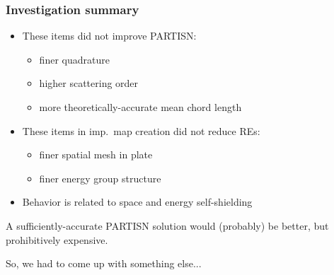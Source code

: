 \documentclass[xcolor=x11names,compress, handout]{beamer}
\renewcommand{\(}{\begin{columns}}
\renewcommand{\)}{\end{columns}}
\newcommand{\<}[1]{\begin{column}{#1}}
\renewcommand{\>}{\end{column}}
\begin{document}
\begin{frame}[fragile]
  \frametitle{Investigation summary}
  
	\begin{itemize}
	\item These items did not improve PARTISN:
	 \begin{itemize}
	 \item finer quadrature
	 \item higher scattering order
	 \item more theoretically-accurate mean chord length
	 \end{itemize}
	\pause 
	\item These items in imp.\ map creation did not reduce REs:
	 \begin{itemize}
	 \item finer spatial mesh in plate
	 \item finer energy group structure
	 \end{itemize}
	\pause 
	\item Behavior is related to space and energy self-shielding
	\end{itemize}
\pause
\vspace*{1 em}
A sufficiently-accurate PARTISN solution would (probably) be better, but prohibitively expensive.

\vspace*{1 em}
So, we had to come up with something else...
  
\end{frame}
\end{document}
